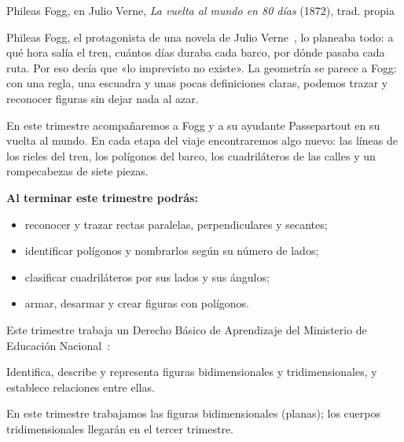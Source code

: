 \documentclass[11pt]{article}
\begin{document}
\encabezado

{Phileas Fogg, en Julio Verne, \emph{La vuelta al mundo en 80 días} (1872), trad. propia}


Phileas Fogg, el protagonista de una novela de Julio Verne~\cite{verne}, lo
planeaba todo: a qué hora salía el tren, cuántos días duraba cada barco,
por dónde pasaba cada ruta. Por eso decía que «lo imprevisto no existe». La
geometría se parece a Fogg: con una regla, una escuadra y unas pocas
definiciones claras, podemos trazar y reconocer figuras sin dejar nada al
azar.

En este trimestre acompañaremos a Fogg y a su ayudante Passepartout en su
vuelta al mundo. En cada etapa del viaje encontraremos algo nuevo: las
líneas de los rieles del tren, los polígonos del barco, los cuadriláteros de
las calles y un rompecabezas de siete piezas.

\textbf{Al terminar este trimestre podrás:}
\begin{itemize}
  \item reconocer y trazar rectas paralelas, perpendiculares y secantes;
  \item identificar polígonos y nombrarlos según su número de lados;
  \item clasificar cuadriláteros por sus lados y sus ángulos;
  \item armar, desarmar y crear figuras con polígonos.
\end{itemize}

Este trimestre trabaja un Derecho Básico de Aprendizaje del Ministerio de
Educación Nacional~\cite{mendba}:

\begin{dba}
Identifica, describe y representa figuras bidimensionales y
tridimensionales, y establece relaciones entre ellas.
\end{dba}

En este trimestre trabajamos las figuras bidimensionales (planas); los
cuerpos tridimensionales llegarán en el tercer trimestre.
\end{document}

